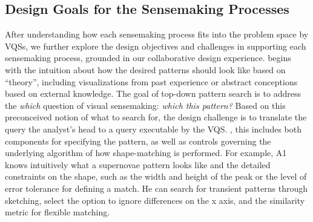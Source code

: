 \subsection{Design Goals for the Sensemaking Processes}
After understanding how each sensemaking process fits into the problem space  by VQSs, we further explore the design objectives and challenges in supporting each sensemaking process, grounded in our collaborative design experience. %
 begins with the  intuition about how the desired patterns should look like based on ``theory'', including visualizations from past experience or abstract conceptions based on external knowledge. The goal of top-down pattern search is to address the \textit{which} question of visual sensemaking: \textit{which  this pattern?} Based on this preconceived notion of what to search for, the design challenge is to translate the query  the analyst's head to a query executable by the VQS. , this includes both components for specifying the pattern, as well as controls governing the underlying
algorithm of how shape-matching is performed. For example, A1 knows intuitively what a supernovae pattern looks like and the detailed constraints on the shape, such as the width and height of the peak or the level of error tolerance for defining a match. He can search for transient patterns through sketching, select the option to ignore differences on the x axis, and  the similarity metric for flexible matching.  %
